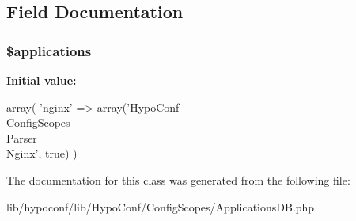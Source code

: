 \subsection{\-Field \-Documentation}
\hypertarget{class_hypo_conf_1_1_config_scopes_1_1_applications_d_b_afef56ede1225281b9c96d0cf2f0a0196}{
\subsubsection[{\$applications}]{\setlength{\rightskip}{0pt plus 5cm}\$applications}}
\label{class_hypo_conf_1_1_config_scopes_1_1_applications_d_b_afef56ede1225281b9c96d0cf2f0a0196}
{\bfseries \-Initial value\-:}
\begin{DoxyCode}
 array(
        'nginx'              => array('HypoConf\\ConfigScopes\\Parser\\Nginx', 
      true)
    )
\end{DoxyCode}


\-The documentation for this class was generated from the following file\-:\begin{DoxyCompactItemize}
\item 
lib/hypoconf/lib/\-Hypo\-Conf/\-Config\-Scopes/\-Applications\-D\-B.\-php\end{DoxyCompactItemize}
